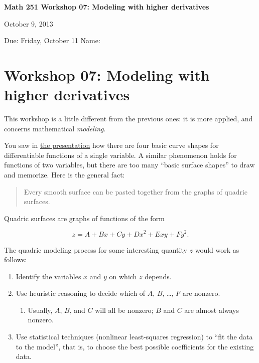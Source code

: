 \documentclass[12pt]{exam}
\theoremstyle{definition}
\begin{document}
\lstset{language=R}
\noindent
\textbf{{\large Math 251 \hfill Workshop 07: Modeling with higher derivatives}}

\noindent
October 9, 2013 

\noindent
Due: Friday, October 11 \hfill Name: \underline{\hspace{3in}} 

\noindent

\section{Workshop 07: Modeling with higher derivatives}

This workshop is a little different from the previous ones: it is more
applied, and concerns mathematical \emph{modeling}.

You saw in \href{../../decks/08/Deck.pdf}{the presentation} how there
are four basic curve shapes for differentiable functions of a single
variable. A similar phenomenon holds for functions of two variables, but
there are too many ``basic surface shapes'' to draw and memorize. Here
is the general fact:

\begin{quote}
Every smooth surface can be pasted together from the graphs of quadric
surfaces.
\end{quote}

Quadric surfaces are graphs of functions of the form

\[z = A + Bx + Cy + Dx^2 + Exy + Fy^2.\]

The quadric modeling process for some interesting quantity $z$ would
work as follows:

\begin{enumerate}
\def\labelenumi{\arabic{enumi}.}
\itemsep1pt\parskip0pt
\item
  Identify the variables $x$ and $y$ on which $z$ depends.
\item
  Use heuristic reasoning to decide which of $A$, $B$, \ldots{}, $F$ are
  nonzero.

  \begin{enumerate}
  \def\labelenumii{\alph{enumii}.}
  \itemsep1pt\parskip0pt
  \item
    Usually, $A$, $B$, and $C$ will all be nonzero; $B$ and $C$ are
    almost always nonzero.
  \end{enumerate}
\item
  Use statistical techniques (nonlinear least-squares regression) to
  ``fit the data to the model'', that is, to choose the best possible
  coefficients for the existing data.
\end{enumerate}
\end{document}
